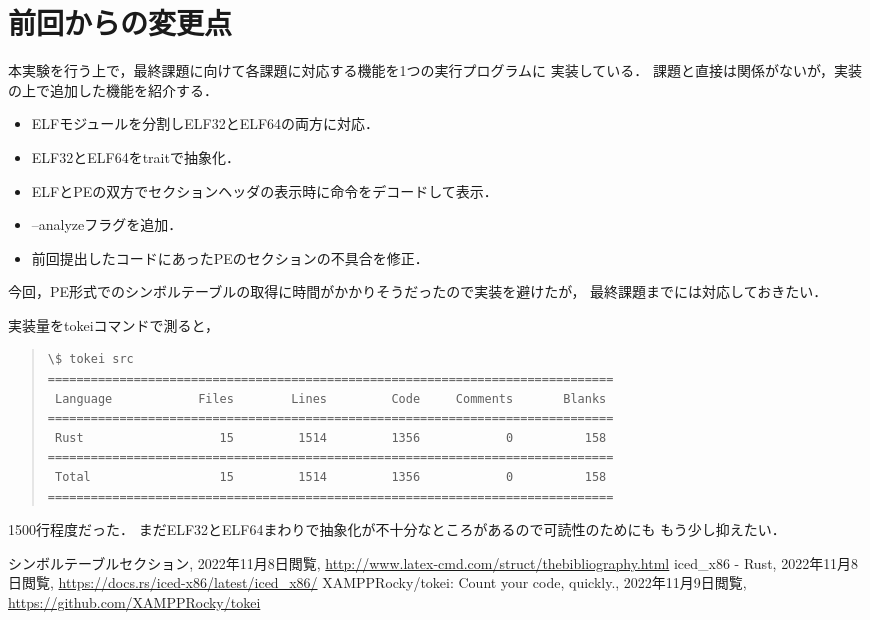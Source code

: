 \documentclass[12pt,a4paper,dvipdfmx]{jsarticle}
\begin{document}
\section{前回からの変更点}
本実験を行う上で，最終課題に向けて各課題に対応する機能を1つの実行プログラムに
実装している．
課題と直接は関係がないが，実装の上で追加した機能を紹介する．
\begin{itemize}
    \item ELFモジュールを分割しELF32とELF64の両方に対応．
    \item ELF32とELF64をtraitで抽象化．
    \item ELFとPEの双方でセクションヘッダの表示時に命令をデコードして表示．
    \item --analyzeフラグを追加．
    \item 前回提出したコードにあったPEのセクションの不具合を修正．
\end{itemize}

今回，PE形式でのシンボルテーブルの取得に時間がかかりそうだったので実装を避けたが，
最終課題までには対応しておきたい．

実装量をtokeiコマンド\cite{tokei}で測ると，
\begin{quote}
\begin{verbatim}
\$ tokei src
===============================================================================
 Language            Files        Lines         Code     Comments       Blanks 
===============================================================================
 Rust                   15         1514         1356            0          158 
===============================================================================
 Total                  15         1514         1356            0          158 
===============================================================================
\end{verbatim}
\end{quote}

1500行程度だった．
まだELF32とELF64まわりで抽象化が不十分なところがあるので可読性のためにも
もう少し抑えたい．

\begin{thebibliography}{9}
        シンボルテーブルセクション, 2022年11月8日閲覧,
        \url{http://www.latex-cmd.com/struct/thebibliography.html}
        iced\_x86 - Rust, 2022年11月8日閲覧,
        \url{https://docs.rs/iced-x86/latest/iced_x86/}
        XAMPPRocky/tokei: Count your code, quickly., 2022年11月9日閲覧,
        \url{https://github.com/XAMPPRocky/tokei}
\end{thebibliography}
\end{document}
